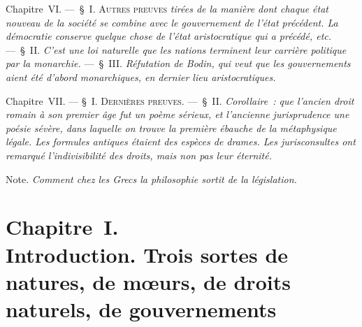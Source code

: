 \documentclass[french,twoside]{book} %
\newcommand\chapteropen{} %
\newcommand\chaptercont{} %
\newcommand\chapterclose{} %
\begin{document}
Chapitre VI. — § {\scshape I. Autres preuves} {\itshape tirées de la manière dont chaque état nouveau de la société se combine avec le gouvernement de l’état précédent. La démocratie conserve quelque chose de l’état aristocratique qui a précédé, etc.} — § II. {\itshape C’est une loi naturelle que les nations terminent leur carrière politique par la monarchie.} — § III. {\itshape Réfutation de Bodin, qui veut que les gouvernements aient été d’abord monarchiques, en dernier lieu aristocratiques.}\par
Chapitre VII. — § {\scshape I. Dernières preuves.} — § II. {\itshape Corollaire : que l’ancien droit romain à son premier âge fut un poème sérieux, et l’ancienne jurisprudence une poésie sévère, dans laquelle on trouve la première ébauche de la métaphysique légale. Les formules antiques étaient des espèces de drames. Les jurisconsultes ont remarqué l’indivisibilité des droits, mais non pas leur éternité.}\par
Note. {\itshape Comment chez les Grecs la philosophie sortit de la législation.}
\chapterclose


\chapteropen
\chapter[{Chapitre I. Introduction. Trois sortes de natures, de mœurs, de droits naturels, de gouvernements}]{Chapitre I. \\
Introduction. Trois sortes de natures, de mœurs, de droits naturels, de gouvernements}

\chaptercont
\end{document}

